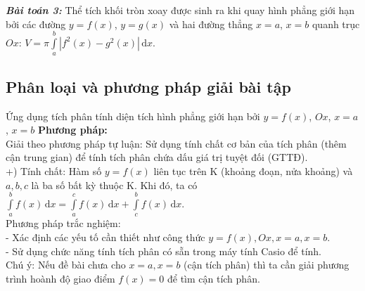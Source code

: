 \textbf{\textit{Bài toán 3: }}Thể tích khối tròn xoay được sinh ra khi quay hình phẳng giới hạn bởi các đường $y=f(x)$, $y=g(x)$ và hai đường thẳng $x=a$, $x=b$ quanh trục $Ox$: $V=\pi\displaystyle\int\limits_a^b\left|f^2(x)-g^2(x)\right|\mathrm{\,d}x$.
\subsection{Phân loại và phương pháp giải bài tập}
\begin{dang}{Ứng dụng tích phân tính diện tích hình phẳng giới hạn bởi $y=f(x)$, $Ox$, $x=a$, $x=b$}
	\textbf{Phương pháp:} \\
	Giải theo phương pháp tự luận: Sử dụng tính chất cơ bản của tích phân (thêm cận trung gian) để tính tích phân chứa dấu giá trị tuyệt đối (GTTĐ).\\
	+) Tính chất: Hàm số $y=f(x)$ liên tục trên K (khoảng đoạn, nửa khoảng) và $a,b,c$ là ba số bất kỳ thuộc K. Khi đó, ta có $\displaystyle\int\limits_a^b f(x)\mathrm{\,d}x=\displaystyle\int\limits_a^c f(x)\mathrm{\,d}x+\displaystyle\int\limits_c^b f(x)\mathrm{\,d}x$.\\
	Phương pháp trắc nghiệm:\\
	- Xác định các yếu tố cần thiết như công thức $y=f(x), Ox, x=a,x=b$.\\
	- Sử dụng chức năng tính tích phân có sẵn trong máy tính Casio để tính.\\
	Chú ý: Nếu đề bài chưa cho $x=a, x=b$ (cận tích phân) thì ta cần giải phương trình hoành độ giao điểm $f(x)=0$ để tìm cận tích phân.
\end{dang}
